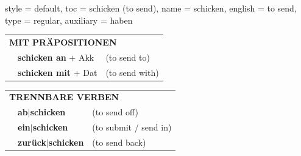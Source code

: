 \begin{verbentry}{
  style = {default},
  toc = {schicken (to send)},
  name = {schicken},
  english = {to send},
  type = {regular},
  auxiliary = {haben}
}
\vspace{10pt}

\begin{tabular}{lll}
\multicolumn{3}{l}{\textbf{MIT PRÄPOSITIONEN}}\\
& \textbf{schicken an} + Akk & (to send to)\\
& \textbf{schicken mit} + Dat & (to send with)\\
\end{tabular}
\hfill
\begin{tabular}{lll}
\multicolumn{3}{l}{\textbf{TRENNBARE VERBEN}}\\
& \textbf{ab$|$schicken} & (to send off)\\
& \textbf{ein$|$schicken} & (to submit / send in)\\
& \textbf{zurück$|$schicken} & (to send back)\\
\end{tabular}
\vspace{-5pt}
\end{verbentry}

